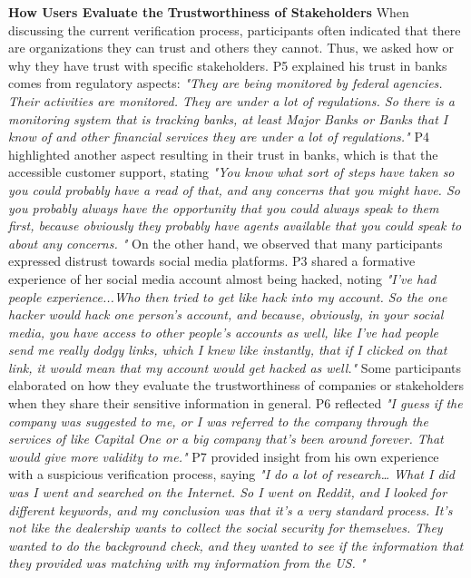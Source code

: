 \textbf{How Users Evaluate the Trustworthiness of Stakeholders} When discussing the current verification process, participants often indicated that there are organizations they can trust and others they cannot. Thus, we asked how or why they have trust with specific stakeholders. P5 explained his trust in banks comes from regulatory aspects: \textit{"They are being monitored by federal agencies. Their activities are monitored. They are under a lot of regulations. So there is a monitoring system that is tracking banks, at least Major Banks or Banks that I know of and other financial services they are under a lot of regulations."} P4 highlighted another aspect resulting in their trust in banks,  which is that the accessible customer support, stating \textit{"You know what sort of steps have taken so you could probably have a read of that, and any concerns that you might have. So you probably always have the opportunity that you could always speak to them first, because obviously they probably have agents available that you could speak to about any concerns. "} On the other hand, we observed that many participants expressed distrust towards social media platforms. P3 shared a formative experience of her social media account almost being hacked, noting \textit{"I've had people experience...Who then tried to get like hack into my account. So the one hacker would hack one person's account, and because, obviously, in your social media, you have access to other people's accounts as well, like I've had people send me really dodgy links, which I knew like instantly, that if I clicked on that link, it would mean that my account would get hacked as well."} Some participants elaborated on how they evaluate the trustworthiness of companies or stakeholders when they share their sensitive information in general. P6 reflected \textit{"I guess if the company was suggested to me, or I was referred to the company through the services of like Capital One or a big company that's been around forever. That would give more validity to me."} P7 provided insight from his own experience with a suspicious verification process, saying \textit{"I do a lot of research… What I did was I went and searched on the Internet. So I went on Reddit, and I looked for different keywords, and my conclusion was that it's a very standard process. It's not like the dealership wants to collect the social security for themselves. They wanted to do the background check, and they wanted to see if the information that they provided was matching with my information from the US. "}

